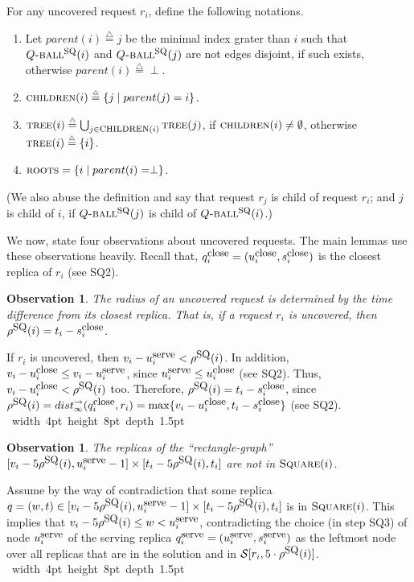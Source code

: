 \documentclass[11pt]{article}
\newtheorem{observation}[theorem]{Observation}
\def\proof{\par\noindent{\bf Proof:~}}
\def\blackslug{\hbox{\hskip 1pt \vrule width 4pt height 8pt
    depth 1.5pt \hskip 1pt}}
\def\QED{\quad\blackslug\lower 8.5pt\null\par}
\newcommand{\calS}{\mathcal{S}}
\newcommand{\Square}[0]{\mbox{\sc Square}}
\newcommand{\rr}{r}
\newcommand{\distinf}[1]{{dist}^{\rightarrow}_{\infty}(#1)}
\newcommand{\qSQ}{q^{\mbox{\small\upshape serve}}}
\newcommand{\uSQ}{u^{\mbox{\small\upshape serve}}}
\newcommand{\sSQ}{s^{\mbox{\small\upshape serve}}}
\newcommand{\qclose}{q^{\mbox{\small\upshape close}}}
\newcommand{\uclose}{u^{\mbox{\small\upshape close}}}
\newcommand{\sclose}{s^{\mbox{\small\upshape close}}}
\newcommand{\eqdf}{\stackrel{\scriptscriptstyle \triangle}{=}}
\newcommand{\rhoSQ}[0]{\rho^{\mbox{\small\upshape SQ}}}
\newcommand{\seq}[1]{\calS[#1]}
\newcommand{\Tree}[0]{\mbox{\sc tree}}
\newcommand{\parent}[0]{parent}
\newcommand{\suns}[0]{\mbox{\sc children}}
\newcommand{\roots}[0]{\mbox{\sc roots}}
\newcommand{\SQball}[0]{Q{\mbox{\sc -ball}}^{\mbox{\sc sq}}}
\begin{document}
For any uncovered request $\rr_i$, define the following notations.
\begin{enumerate}

\item Let $\parent(i)\eqdf j$ be the minimal index grater than $i$ such that $\SQball(i)$  and $\SQball(j)$ are not edges disjoint, if such exists, otherwise $\parent(i)\eqdf\perp$.

\item $\suns(i) \eqdf \{j \mid \parent(j)=i\}$.

\item $\Tree(i) \eqdf \bigcup_{j\in\suns(i)}\Tree(j)$, if $\suns(i)\not=\emptyset$, otherwise $\Tree(i) \eqdf \{i\}$.

\item $\roots=\{ i \mid \parent(i)=\perp\}$.

\end{enumerate}
(We also abuse the definition and say that request $r_j$ is child of request $r_i$; and $j$ is child of $i$, if $\SQball(j)$ is child of $\SQball(i)$.)


We now, state four observations about uncovered requests.
The main lemmas use these observations heavily.
Recall that, $\qclose_i=(\uclose_i,\sclose_i)$ is the closest replica of $r_i$ (see SQ2).

\begin{observation}
The radius of an uncovered request is determined by the {\em time difference} from its closest replica.
That is, if a request $\rr_i$ is uncovered, then $\rhoSQ(i)=t_i-\sclose_i$. \label{obser:sqr: if ri is uncovered then rad(i)= ti-s'i}
\end{observation}
\proof
If $\rr_i$ is uncovered, then $v_i-\uSQ_i < \rhoSQ(i)$.
In addition, $v_i-\uclose_i \leq v_i-\uSQ_i$, since $\uSQ_i\leq \uclose_i$ (see SQ2).
Thus, $v_i-\uclose_i <\rhoSQ(i)$ too.
Therefore, $\rhoSQ(i)=t_i-\sclose_i$, since $\rhoSQ(i)=\distinf{\qclose_i,r_i}=\max\{v_i-\uclose_i, t_i-\sclose_i\}$ (see SQ2).
\QED


\begin{observation}
The replicas of the ``rectangle-graph'' $[v_i-5\rhoSQ(i),\uSQ_i-1]\times[t_i-5\rhoSQ(i),t_i]$
are not in $\Square(i)$.
\label{obser:sqr: no replicas is in left rectangle}
\end{observation}
\proof
Assume by the way of contradiction that some replica $q=(w,t)\in[v_i-5\rhoSQ(i),\uSQ_i-1]\times[t_i-5\rhoSQ(i),t_i]$ is in $\Square(i)$.
This implies that $v_i-5\rhoSQ(i)\leq w<\uSQ_i$,
contradicting the choice (in step SQ3) of node $\uSQ_i$ of the serving replica $\qSQ_i=(\uSQ_i,\sSQ_i)$ as the leftmost node over all replicas that are in the solution and in $\seq{r_i,5\cdot\rhoSQ(i)}$.
\QED
\end{document}
